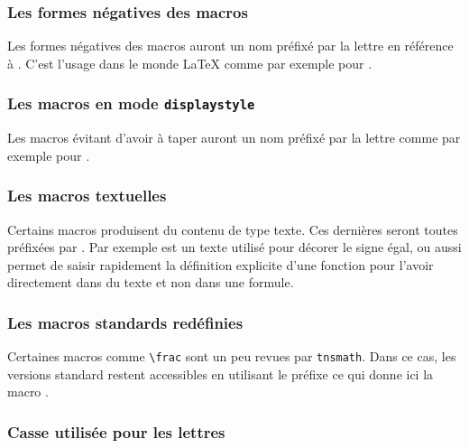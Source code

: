 \documentclass[12pt,a4paper]{book}
\begin{document}


\subsubsection{Les formes \og négatives \fg{} des macros}

Les formes \og négatives \fg{} des macros auront un nom préfixé par la lettre  en référence à . C'est l'usage dans le monde \LaTeX{} comme par exemple pour . 




\subsubsection{Les macros en mode \texttt{displaystyle}}

Les macros évitant d'avoir à taper  auront un nom préfixé par la lettre  comme par exemple pour .




\subsubsection{Les macros \og textuelles \fg}

Certains macros produisent du contenu de type texte. Ces dernières seront toutes préfixées par .
Par exemple  est un texte utilisé pour décorer le signe égal, ou aussi  permet de saisir rapidement la définition explicite d'une fonction pour l'avoir directement dans du texte et non dans une formule.




\subsubsection{Les macros standards redéfinies}

Certaines macros comme \verb+\frac+ sont un peu revues par \verb+tnsmath+.
Dans ce cas, les versions standard restent accessibles en utilisant le préfixe  ce qui donne ici la macro .




\subsubsection{Casse utilisée pour les lettres}
\end{document}
